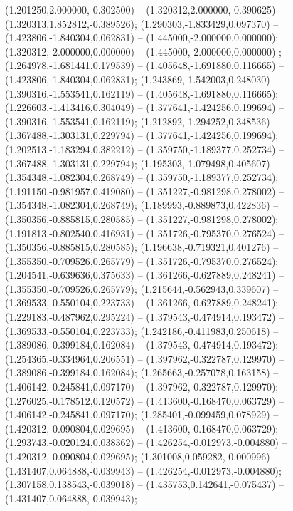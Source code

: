  (1.201250,2.000000,-0.302500) -- (1.320312,2.000000,-0.390625) -- (1.320313,1.852812,-0.389526);
 (1.290303,-1.833429,0.097370) -- (1.423806,-1.840304,0.062831) -- (1.445000,-2.000000,0.000000);
 (1.320312,-2.000000,0.000000) -- (1.445000,-2.000000,0.000000) ;
 (1.264978,-1.681441,0.179539) -- (1.405648,-1.691880,0.116665) -- (1.423806,-1.840304,0.062831);
 (1.243869,-1.542003,0.248030) -- (1.390316,-1.553541,0.162119) -- (1.405648,-1.691880,0.116665);
 (1.226603,-1.413416,0.304049) -- (1.377641,-1.424256,0.199694) -- (1.390316,-1.553541,0.162119);
 (1.212892,-1.294252,0.348536) -- (1.367488,-1.303131,0.229794) -- (1.377641,-1.424256,0.199694);
 (1.202513,-1.183294,0.382212) -- (1.359750,-1.189377,0.252734) -- (1.367488,-1.303131,0.229794);
 (1.195303,-1.079498,0.405607) -- (1.354348,-1.082304,0.268749) -- (1.359750,-1.189377,0.252734);
 (1.191150,-0.981957,0.419080) -- (1.351227,-0.981298,0.278002) -- (1.354348,-1.082304,0.268749);
 (1.189993,-0.889873,0.422836) -- (1.350356,-0.885815,0.280585) -- (1.351227,-0.981298,0.278002);
 (1.191813,-0.802540,0.416931) -- (1.351726,-0.795370,0.276524) -- (1.350356,-0.885815,0.280585);
 (1.196638,-0.719321,0.401276) -- (1.355350,-0.709526,0.265779) -- (1.351726,-0.795370,0.276524);
 (1.204541,-0.639636,0.375633) -- (1.361266,-0.627889,0.248241) -- (1.355350,-0.709526,0.265779);
 (1.215644,-0.562943,0.339607) -- (1.369533,-0.550104,0.223733) -- (1.361266,-0.627889,0.248241);
 (1.229183,-0.487962,0.295224) -- (1.379543,-0.474914,0.193472) -- (1.369533,-0.550104,0.223733);
 (1.242186,-0.411983,0.250618) -- (1.389086,-0.399184,0.162084) -- (1.379543,-0.474914,0.193472);
 (1.254365,-0.334964,0.206551) -- (1.397962,-0.322787,0.129970) -- (1.389086,-0.399184,0.162084);
 (1.265663,-0.257078,0.163158) -- (1.406142,-0.245841,0.097170) -- (1.397962,-0.322787,0.129970);
 (1.276025,-0.178512,0.120572) -- (1.413600,-0.168470,0.063729) -- (1.406142,-0.245841,0.097170);
 (1.285401,-0.099459,0.078929) -- (1.420312,-0.090804,0.029695) -- (1.413600,-0.168470,0.063729);
 (1.293743,-0.020124,0.038362) -- (1.426254,-0.012973,-0.004880) -- (1.420312,-0.090804,0.029695);
 (1.301008,0.059282,-0.000996) -- (1.431407,0.064888,-0.039943) -- (1.426254,-0.012973,-0.004880);
 (1.307158,0.138543,-0.039018) -- (1.435753,0.142641,-0.075437) -- (1.431407,0.064888,-0.039943);
